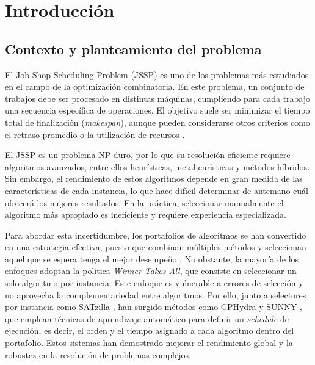 \chapter{Introducción}
\label{cap:introduccion}

\section{Contexto y planteamiento del problema}
\label{sec:contexto}

El Job Shop Scheduling Problem (JSSP) es uno de los problemas más estudiados en
el campo de la optimización combinatoria. En este problema, un conjunto de
trabajos debe ser procesado en distintas máquinas, cumpliendo para cada trabajo
una secuencia específica de operaciones. El objetivo suele ser minimizar el
tiempo total de finalización (\textit{makespan}), aunque pueden considerarse
otros criterios como el retraso promedio o la utilización de recursos
\citep{pinedo2022}.

El JSSP es un problema NP-duro, por lo que su resolución eficiente requiere
algoritmos avanzados, entre ellos heurísticas, metaheurísticas y métodos
híbridos. Sin embargo, el rendimiento de estos algoritmos depende en gran
medida de las características de cada instancia, lo que hace difícil determinar
de antemano cuál ofrecerá los mejores resultados. En la práctica, seleccionar
manualmente el algoritmo más apropiado es ineficiente y requiere experiencia
especializada.

Para abordar esta incertidumbre, los portafolios de algoritmos se han
convertido en una estrategia efectiva, puesto que combinan múltiples métodos y
seleccionan aquel que se espera tenga el mejor desempeño
\citep{smithmiles2009}. No obstante, la mayoría de los enfoques adoptan la
política \textit{Winner Takes All}, que consiste en seleccionar un solo
algoritmo por instancia. Este enfoque es vulnerable a errores de selección y no
aprovecha la complementariedad entre algoritmos. Por ello, junto a selectores por
instancia como SATzilla \citep{xu2008satzilla}, han surgido métodos como
CPHydra \citep{omahony2008cphydra} y SUNNY \citep{amadini2014sunny}, que
emplean técnicas de aprendizaje automático para definir un \textit{schedule}
de ejecución, es decir, el orden y el tiempo asignado a cada algoritmo dentro
del portafolio. Estos sistemas han demostrado
mejorar el rendimiento global y la robustez en la resolución de problemas
complejos.

